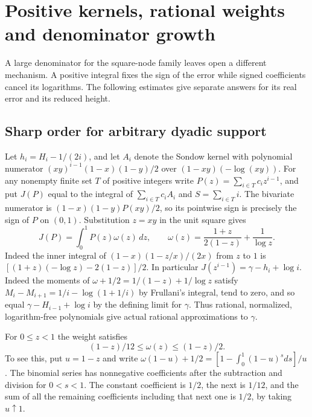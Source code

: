 \documentclass[11pt,a4paper,oneside,openany]{report}
\theoremstyle{remark}\newtheorem{remark}[theorem]{Remark}
\numberwithin{equation}{section}
\begin{document}
\section{Positive kernels, rational weights and denominator growth}\label{ch4:sec:positive}
A large denominator for the square-node family leaves open a different mechanism. A positive integral fixes the sign of the error while signed coefficients cancel its logarithms. The following estimates give separate answers for its real error and its reduced height.
\subsection{Sharp order for arbitrary dyadic support}
Let $h_i=H_i-1/(2i)$, and let $A_i$ denote the Sondow kernel with
polynomial numerator $(xy)^{i-1}(1-x)(1-y)/2$ over
$(1-xy)(-\log(xy))$. For any nonempty finite set $T$ of positive integers
write
$P(z)=\sum_{i\in T}c_i z^{i-1}$, and put
$J(P)$ equal to the integral of $\sum_{i\in T}c_i A_i$ and $S=\sum_{i\in T}i$.
The bivariate numerator is $(1-x)(1-y)P(xy)/2$, so its pointwise
sign is precisely the sign of $P$ on $(0,1)$. Substitution $z=xy$
in the unit square gives
\[
 J(P)=\int_0^1P(z)\omega(z)\,dz,\qquad
 \omega(z)=\frac{1+z}{2(1-z)}+\frac1{\log z}.
\]
Indeed the inner integral of $(1-x)(1-z/x)/(2x)$ from $z$ to $1$
is $[(1+z)(-\log z)-2(1-z)]/2$.
In particular $J(z^{i-1})=\gamma-h_i+\log i$. Indeed the moments of
$\omega+1/2=1/(1-z)+1/\log z$ satisfy
$M_i-M_{i+1}=1/i-\log(1+1/i)$ by Frullani's integral, tend to zero,
and so equal $\gamma-H_{i-1}+\log i$ by the defining limit for
$\gamma$. Thus rational, normalized, logarithm-free polynomials give
actual rational approximations to $\gamma$.

For $0\le z<1$ the weight satisfies
\[
                  (1-z)/12\le\omega(z)\le(1-z)/2 .
\]
To see this, put $u=1-z$ and write
$\omega(1-u)+1/2=[1-\int_0^1(1-u)^sds]/u$.
The binomial series has nonnegative coefficients after the subtraction
and division for $0<s<1$. The constant coefficient is $1/2$, the next
is $1/12$, and the sum of all the remaining coefficients including
that next one is $1/2$, by taking $u\uparrow1$.
\end{document}
